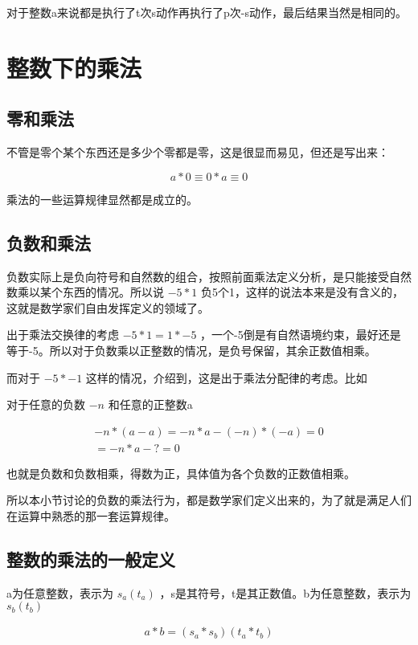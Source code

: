 \documentclass[12pt,oneside]{book}
\begin{document}
对于整数a来说都是执行了t次s动作再执行了p次-s动作，最后结果当然是相同的。

\section{整数下的乘法}
\subsection{零和乘法}
不管是零个某个东西还是多少个零都是零，这是很显而易见，但还是写出来：

\begin{equation}
a * 0 \equiv 0 * a \equiv 0
\end{equation}

乘法的一些运算规律显然都是成立的。

\subsection{负数和乘法}
负数实际上是负向符号和自然数的组合，按照前面乘法定义分析，是只能接受自然数乘以某个东西的情况。所以说 $-5*1$ 负5个1，这样的说法本来是没有含义的，这就是数学家们自由发挥定义的领域了。

出于乘法交换律的考虑 $-5*1=1*-5$ ，一个-5倒是有自然语境约束，最好还是等于-5。所以对于负数乘以正整数的情况，是负号保留，其余正数值相乘。

而对于 $-5*-1$ 这样的情况，\cite{什么是数学}介绍到，这是出于乘法分配律的考虑。比如

对于任意的负数 $-n$ 和任意的正整数a

\begin{align*}
-n * (a-a) = -n * a - (-n)*(-a) =0\\
=-n*a - ? =0
\end{align*}

也就是负数和负数相乘，得数为正，具体值为各个负数的正数值相乘。

所以本小节讨论的负数的乘法行为，都是数学家们定义出来的，为了就是满足人们在运算中熟悉的那一套运算规律。

\subsection{整数的乘法的一般定义}
a为任意整数，表示为 $s_a(t_a)$ ，s是其符号，t是其正数值。b为任意整数，表示为 $s_b(t_b)$ 

\begin{align}
a * b = (s_a*s_b)(t_a*t_b)
\end{align}
\end{document}
